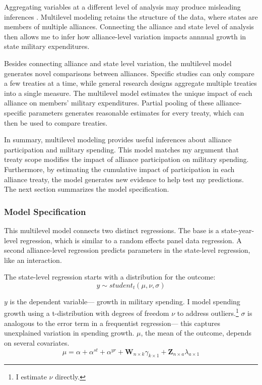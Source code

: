 \documentclass[12pt]{article}
\begin{document}
Aggregating variables at a different level of analysis may produce misleading inferences \citep{McElreath2016}. 
Multilevel modeling retains the structure of the data, where states are members of multiple alliances. 
Connecting the alliance and state level of analysis then allows me to infer how alliance-level variation impacts annnual growth in state military expenditures. 


Besides connecting alliance and state level variation, the multilevel model generates novel comparisons between alliances. 
Specific studies can only compare a few treaties at a time, while general research designs aggregate multiple treaties into a single measure. 
The multilevel model estimates the unique impact of each alliance on members' military expenditures. 
Partial pooling of these alliance-specific parameters generates reasonable estimates for every treaty, which can then be used to compare treaties. 


In summary, multilevel modeling provides useful inferences about alliance participation and military spending. 
This model matches my argument that treaty scope modifies the impact of alliance participation on military spending. 
Furthermore, by estimating the cumulative impact of participation in each alliance treaty, the model generates new evidence to help test my predictions. 
The next section summarizes the model specification. 
 


\subsubsection{Model Specification} 

This multilevel model connects two distinct regressions. 
The base is a state-year-level regression, which is similar to a random effects panel data regression.
A second alliance-level regression predicts parameters in the state-level regression, like an interaction. 


The state-level regression starts with a distribution for the outcome:
\begin{equation}
y \sim student_t(\mu, \nu, \sigma)
\end{equation}
 

$y$ is the dependent variable--- growth in military spending. 
I model spending growth using a t-distribution with degrees of freedom $\nu$ to address outliers.\footnote{I estimate $\nu$ directly.}
$\sigma$ is analogous to the error term in a frequentist regression--- this captures unexplained variation in spending growth.  
$\mu$, the mean of the outcome, depends on several covariates.
\begin{equation}
\mu = \alpha + \alpha^{st} + \alpha^{yr} +\textbf{W}_{n \times k} \gamma_{k \times 1}  + \textbf{Z}_{n \times a} \lambda_{a \times 1} 
\end{equation}
\end{document}
